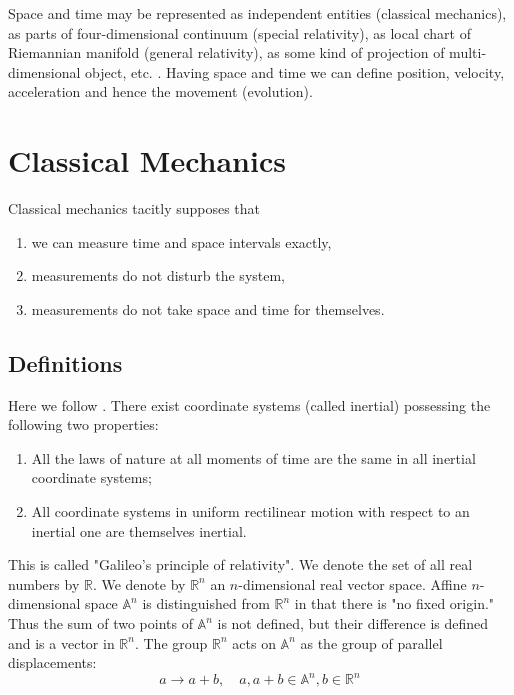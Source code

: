 \documentclass[11pt]{report}
\begin{document}
Space and time may be represented as independent entities (classical mechanics), as parts of 
four-dimensional continuum (special relativity), as local chart
of Riemannian manifold (general relativity), as some kind of projection
of multi-dimensional object, etc. . Having space and time we can define position, velocity, acceleration  and hence the movement (evolution).



\chapter{Classical Mechanics}
\label{class-mech}
Classical mechanics tacitly supposes that
\begin{enumerate}
    \item we can measure time and space intervals exactly,
    \item measurements do not disturb the system,
    \item measurements do not take space and time for themselves.
\end{enumerate}

\section{Definitions}
\label{class-mech-def}

Here we follow  \cite{arnold-cm-r}.%
There exist coordinate systems (called inertial) possessing the following two properties:
\begin{enumerate}
    \item All the laws of nature at all moments of time are the same in all inertial coordinate systems;
    \item  All coordinate systems in uniform rectilinear motion with respect to an inertial one are themselves inertial.
\end{enumerate}
This is called "Galileo's principle of relativity".
We denote the set of all real numbers by $\mathbb{R}$. We denote by $\mathbb{R}^n$ an $n$-dimensional 
real vector space. Affine $n$-dimensional space $\mathbb{A}^n$ is distinguished 
from $\mathbb{R}^n$ in that there is "no fixed origin." Thus the sum of two points
of $\mathbb{A}^n$ is not defined, but their difference is defined and is a vector in $\mathbb{R}^n$.
The group $\mathbb{R}^n$ acts on $\mathbb{A}^n$ as the group of parallel displacements: 
\[a \rightarrow a+b,\quad a,a+b \in \mathbb{A}^n,b\in\mathbb{R}^n\]
\end{document}
